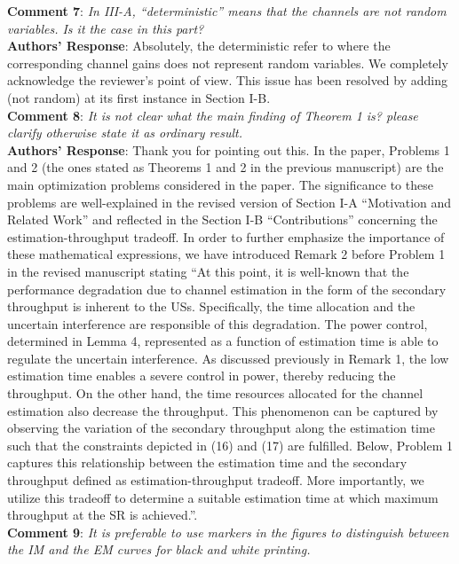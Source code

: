 \documentclass[12pt,a4wide,peerreview]{IEEEtran}
\newcommand{\tc}[1]{#1}
\begin{document}
\textbf{\tc{Comment 7}}: 
\textit{
In III-A, ``deterministic'' means that the channels are not random variables. Is it the case in this part?
}
\\
\textbf{Authors' Response}:
Absolutely, the deterministic refer to where the corresponding channel gains does not represent random variables. We completely acknowledge the reviewer's point of view. This issue has been resolved by adding (not random) at its first instance in Section I-B.
\\
\textbf{\tc{Comment 8}}: 
\textit{
It is not clear what the main finding of Theorem 1 is? please clarify otherwise state it as ordinary result.
}
\\
\textbf{Authors' Response}:
Thank you for pointing out this. In the paper, Problems 1 and 2 (the ones stated as Theorems 1 and 2 in the previous manuscript) are the main optimization problems considered in the paper. The significance to these problems are well-explained in the revised version of Section I-A ``Motivation and Related Work'' and reflected in the Section I-B ``Contributions'' concerning the estimation-throughput tradeoff. In order to further emphasize the importance of these mathematical expressions, we have introduced Remark 2 before Problem 1 in the revised manuscript stating ``At this point, it is well-known that the performance degradation due to channel estimation in the form of the secondary throughput is inherent to the USs. Specifically, the time allocation and the uncertain interference are responsible of this degradation. The power control, determined in Lemma 4, represented as a function of estimation time is able to regulate the uncertain interference. As discussed previously in Remark 1, the low estimation time enables a severe control in power, thereby reducing the throughput. On the other hand, the time resources allocated for the channel estimation also decrease the throughput. This phenomenon can be captured by observing the variation of the secondary throughput along the estimation time such that the constraints depicted in (16) and (17) are fulfilled. Below, Problem 1 captures this relationship between the estimation time and the secondary throughput defined as estimation-throughput tradeoff. More importantly, we utilize this tradeoff to determine a suitable estimation time at which maximum throughput at the SR is achieved.''.
\\
\textbf{\tc{Comment 9}}: 
\textit{
It is preferable to use markers in the figures to distinguish between the IM and the EM curves for black and white printing.
}
\\
\end{document}
